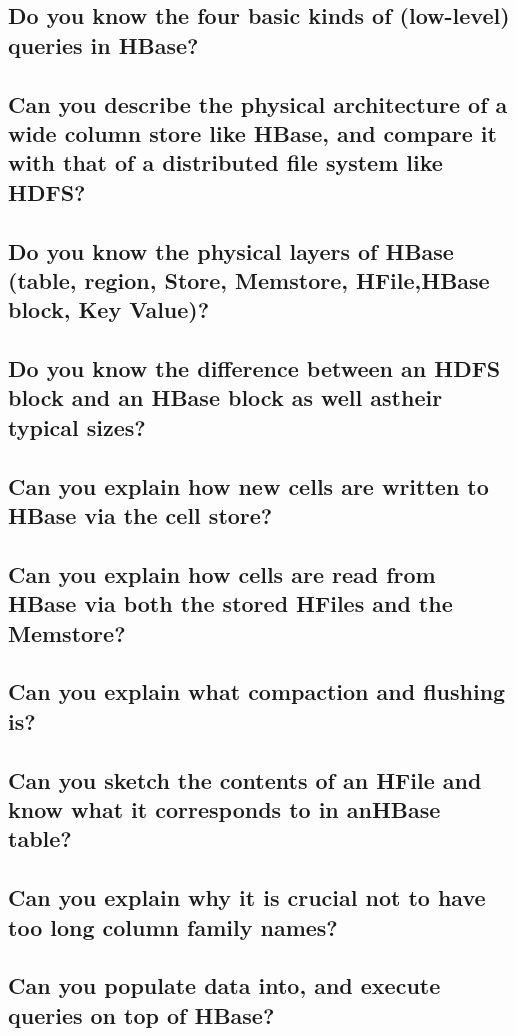 \documentclass{article}
\begin{document}
\subsection{Do you know the four basic kinds of (low-level) queries in HBase?}
\subsection{Can you describe the physical architecture of a wide column store like HBase, and compare it with that of a distributed file system like HDFS?}
\subsection{Do you know the physical layers of HBase (table, region, Store, Memstore, HFile,HBase block, Key Value)?}
\subsection{Do you know the difference between an HDFS block and an HBase block as well astheir typical sizes?}
\subsection{Can you explain how new cells are written to HBase via the cell store?}
\subsection{Can you explain how cells are read from HBase via both the stored HFiles and the Memstore?}
\subsection{Can you explain what compaction and flushing is?}
\subsection{Can you sketch the contents of an HFile and know what it corresponds to in anHBase table?}
\subsection{Can you explain why it is crucial not to have too long column family names?}
\subsection{Can you populate data into, and execute queries on top of HBase?}
\end{document}
